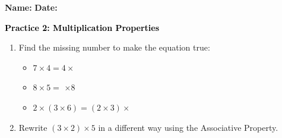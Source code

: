 \documentclass[12pt, letterpaper, fleqn]{article}
\newcommand{\blank}{\underline{\hspace{2.2cm}}}
\newcommand{\blanklong}{\underline{\hspace{6.5cm}}}
\begin{document}
\textbf{Name:} \underline{\hspace{5cm}}
\hfill
\textbf{Date:} \underline{\hspace{3cm}}\\

\begin{tcolorbox}[colback=customteal!20]
    \large\textcolor{black}{\textbf{Practice 2: Multiplication Properties}}
\end{tcolorbox}

\vspace{5mm}
\begin{enumerate}[itemsep=2cm, leftmargin=0.6cm]
\item Find the missing number to make the equation true:
\begin{itemize}[itemsep=1cm]
  \item $7 \times 4 = 4 \times$ \blank
  \item $8 \times 5 = $ \blank $\times 8$
  \item $2 \times (3 \times 6) = (2 \times 3) \times$ \blank
\end{itemize}

\item Rewrite $(3 \times 2) \times 5$ in a different way using the Associative Property.
\\ \\
\blanklong
\end{enumerate}
\end{document}
